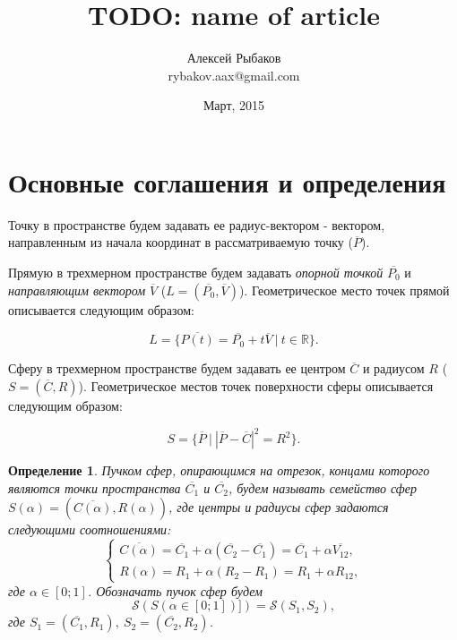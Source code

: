 \documentclass[a4paper,10pt]{extarticle}                     %
\numberwithin{equation}{section}                             %
\numberwithin{figure}{section}                               %
\theoremstyle{plain}                                         %
\newtheorem{definition}{Определение}[section]                %
\begin{document}
\title{TODO: name of article}
\author{Алексей Рыбаков \\ rybakov.aax@gmail.com}
\date{Март, 2015}
\maketitle

\section{Основные соглашения и определения}

Точку в пространстве будем задавать ее радиус-вектором - вектором, направленным из начала координат в рассматриваемую точку ($\overline{P}$).

Прямую в трехмерном пространстве будем задавать \textit{опорной точкой} $\overline{P_0}$ и \textit{направляющим вектором} $\overline{V}$ ($L = (\overline{P_0}, \overline{V})$).
Геометрическое место точек прямой описывается следующим образом:

\begin{equation}
    L = \{ \overline{P(t)} = \overline{P_0} + t\overline{V} \ | \ t \in \mathbb{R} \}.
\end{equation}

Сферу в трехмерном пространстве будем задавать ее центром $\overline{C}$ и радиусом $R$ ($S = (\overline{C}, R)$).
Геометрическое местов точек поверхности сферы описывается следующим образом:

\begin{equation}
    S = \{ \overline{P} \ | \ {|\overline{P} - \overline{C}|}^2 = R^2 \}.
\end{equation}

\begin{definition}
Пучком сфер, опирающимся на отрезок, концами которого являются точки пространства $\overline{C_1}$ и $\overline{C_2}$, будем называть семейство сфер $S(\alpha) = (\overline{C(\alpha)}, R(\alpha))$, где центры и радиусы сфер задаются следующими соотношениями:
\begin{equation}
    \begin{cases}
        \overline{C(\alpha)} = \overline{C_1} + \alpha(\overline{C_2} - \overline{C_1}) = \overline{C_1} + \alpha \overline{V_{12}}, \\
        R(\alpha) = R_1 + \alpha(R_2 - R_1) = R_1 + \alpha R_{12},
    \end{cases}
\end{equation}
где $\alpha \in [0; 1]$.
Обозначать пучок сфер будем
\begin{equation}
    \mathcal{S}(S(\alpha \in [0; 1])]) = \mathcal{S}(S_1, S_2),
\end{equation}
где $S_1 = (\overline{C_1}, R_1), \ S_2 = (\overline{C_2}, R_2)$.
\end{definition}
\end{document}

